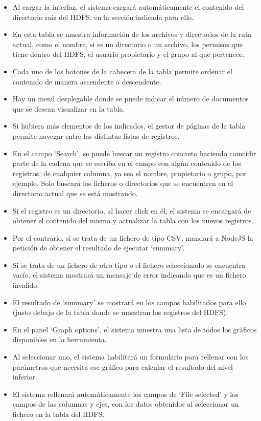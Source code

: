 \begin{itemize}
	\item Al cargar la interfaz, el sistema cargará automáticamente el contenido del directorio raíz del HDFS, en la sección indicada para ello.
	\item En esta tabla se muestra información de los archivos y directorios de la ruta actual, como el nombre, si es un directorio o un archivo, los permisos que tiene dentro del HDFS, el usuario propietario y el grupo al que pertenece.
	\item Cada uno de los botones de la cabecera de la tabla permite ordenar el contenido de manera ascendente o descendente.
	\item Hay un menú desplegable donde se puede indicar el número de documentos que se desean visualizar en la tabla.
	\item Si hubiera más elementos de los indicados, el gestor de páginas de la tabla permite navegar entre las distintas listas de registros.
	\item En el campo ‘Search’, se puede buscar un registro concreto haciendo coincidir parte de la cadena que se escriba en el campo con algún contenido de los registros, de cualquier columna, ya sea el nombre, propietario o grupo, por ejemplo. Solo buscará los ficheros o directorios que se encuentren en el directorio actual que se está mostrando.
	\item Si el registro es un directorio, al hacer click en él, el sistema se encargará de obtener el contenido del mismo y actualizar la tabla con los nuevos registros.
	\item Por el contrario, si se trata de un fichero de tipo CSV, mandará a NodeJS la petición de obtener el resultado de ejecutar ‘summary’.
	\item Si se trata de un fichero de otro tipo o el fichero seleccionado se encuentra vacío, el sistema mostrará un mensaje de error indicando que es un fichero invalido.
	\item El resultado de ‘summary’ se mostrará en los campos habilitados para ello (justo debajo de la tabla donde se muestran los registros del HDFS).
	\item En el panel ‘Graph options’, el sistema muestra una lista de todos los gráficos disponibles en la herramienta. 
	\item Al seleccionar uno, el sistema habilitará un formulario para rellenar con los parámetros que necesita ese gráfico para calcular el resultado del nivel inferior.
	\item El sistema rellenará automáticamente los campos de ‘File selected’ y los campos de las columnas y ejes, con los datos obtenidos al seleccionar un fichero en la tabla del HDFS.

\end{itemize}
